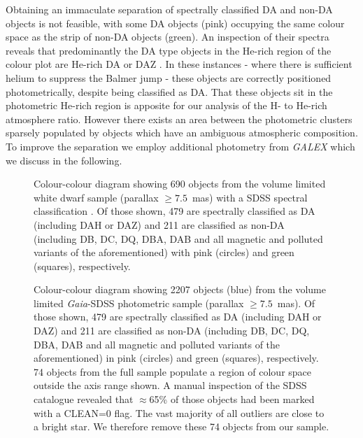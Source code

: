 \documentclass[a4paper,fleqn,usenatbib]{mnras}
\newcommand{\gaia}{{\it Gaia}}
\begin{document}
Obtaining an immaculate separation of spectrally classified DA and non-DA objects is not feasible, with some DA objects (pink) occupying the same colour space as the strip of non-DA objects (green). An inspection of their spectra reveals that predominantly the DA type objects in the He-rich region of the colour plot are He-rich DA or DAZ \citep{zuckerman07,tremblay11,ngf17,rolland18}. In these instances - where there is sufficient helium to suppress the Balmer jump - these objects are correctly positioned photometrically, despite being classified as DA. That these objects sit in the photometric He-rich region is apposite for our analysis of the H- to He-rich atmosphere ratio. However there exists an area between the photometric clusters sparsely populated by objects which have an ambiguous atmospheric composition. To improve the separation we employ additional photometry from {\it GALEX} which we discuss in the following.

\begin{figure}
 \centering
  \caption{Colour-colour diagram showing 690 objects from the volume limited white dwarf sample (parallax $\geq 7.5$~mas) with a SDSS spectral classification \citep{ngf19}. Of those shown, 479 are spectrally classified as DA (including DAH or DAZ) and 211 are classified as non-DA (including DB, DC, DQ, DBA, DAB and all magnetic and polluted variants of the aforementioned) with pink (circles) and green (squares), respectively.}
 \label{fg:col-SDSS-spec}
\end{figure}

\begin{figure}
 \centering
  \caption{Colour-colour diagram showing 2207 objects (blue) from the volume limited \gaia-SDSS photometric sample (parallax $\geq 7.5$~mas). Of those shown, 479 are spectrally classified as DA (including DAH or DAZ) and 211 are classified as non-DA (including DB, DC, DQ, DBA, DAB and all magnetic and polluted variants of the aforementioned) in pink (circles) and green (squares), respectively. 74 objects from the full sample populate a region of colour space outside the axis range shown. A manual inspection of the SDSS catalogue revealed that $\approx$65\% of those objects had been marked with a CLEAN=0 flag. The vast majority of all outliers are close to a bright star. We therefore remove these 74 objects from our sample.}
 \label{fg:col-SDSS}
\end{figure}
\end{document}
